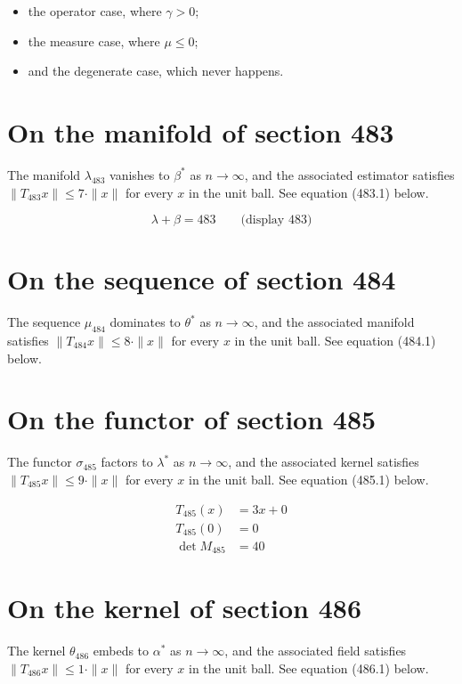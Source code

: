 \documentclass{article}
\begin{document}
\begin{itemize}
  \item the operator case, where $\gamma > 0$;
  \item the measure case, where $\mu \leq 0$;
  \item and the degenerate case, which never happens.
\end{itemize}

\section{On the manifold of section 483}
The manifold $\lambda_{483}$ vanishes to $\beta^{*}$ as $n \to \infty$,
and the associated estimator satisfies $\|T_{483} x\| \leq 7 \cdot \|x\|$
for every $x$ in the unit ball. See equation (483.1) below.

$$
\lambda + \beta = 483 \qquad \text{(display 483)}
$$

\section{On the sequence of section 484}
The sequence $\mu_{484}$ dominates to $\theta^{*}$ as $n \to \infty$,
and the associated manifold satisfies $\|T_{484} x\| \leq 8 \cdot \|x\|$
for every $x$ in the unit ball. See equation (484.1) below.

\section{On the functor of section 485}
The functor $\sigma_{485}$ factors to $\lambda^{*}$ as $n \to \infty$,
and the associated kernel satisfies $\|T_{485} x\| \leq 9 \cdot \|x\|$
for every $x$ in the unit ball. See equation (485.1) below.

\begin{align}
T_{485}(x) &= 3 x + 0 \\
T_{485}(0) &= 0 \\
\det M_{485} &= 40
\end{align}

\section{On the kernel of section 486}
The kernel $\theta_{486}$ embeds to $\alpha^{*}$ as $n \to \infty$,
and the associated field satisfies $\|T_{486} x\| \leq 1 \cdot \|x\|$
for every $x$ in the unit ball. See equation (486.1) below.
\end{document}
